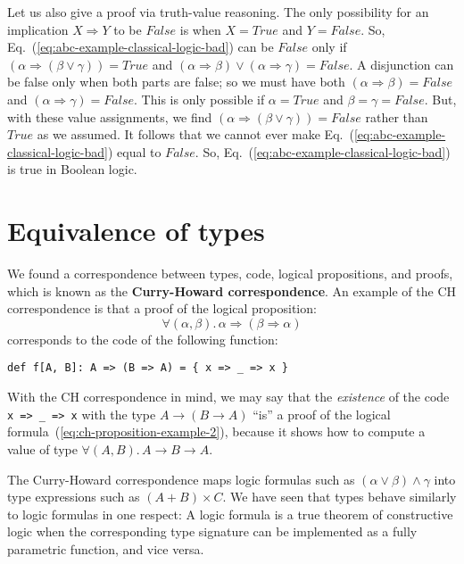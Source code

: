 Let us also give a proof via truth-value reasoning. The only possibility
for an implication $X\Rightarrow Y$ to be $False$ is when $X=True$
and $Y=False$. So, Eq.~(\ref{eq:abc-example-classical-logic-bad})
can be $False$ only if $\left(\alpha\Rightarrow(\beta\vee\gamma)\right)=True$
and $\left(\alpha\Rightarrow\beta\right)\vee\left(\alpha\Rightarrow\gamma\right)=False$.
A disjunction can be false only when both parts are false; so we must
have both $\left(\alpha\Rightarrow\beta\right)=False$ and $\left(\alpha\Rightarrow\gamma\right)=False$.
This is only possible if $\alpha=True$ and $\beta=\gamma=False$.
But, with these value assignments, we find $\left(\alpha\Rightarrow(\beta\vee\gamma)\right)=False$
rather than $True$ as we assumed. It follows that we cannot ever
make Eq.~(\ref{eq:abc-example-classical-logic-bad}) equal to $False$.
So, Eq.~(\ref{eq:abc-example-classical-logic-bad}) is true in Boolean
logic.

\section{Equivalence of types}

We found a correspondence between types, code, logical propositions,
and proofs, which is known as the \textbf{Curry-Howard correspondence}.
An example of the CH correspondence is that a proof of the logical
proposition:
\begin{equation}
\forall(\alpha,\beta).\,\alpha\Rightarrow\left(\beta\Rightarrow\alpha\right)\label{eq:ch-proposition-example-2}
\end{equation}
corresponds to the code of the following function:
\begin{lstlisting}
def f[A, B]: A => (B => A) = { x => _ => x }
\end{lstlisting}
With the CH correspondence in mind, we may say that the \emph{existence}
of the code \lstinline!x => _ => x! with the type $A\rightarrow(B\rightarrow A)$
\textsf{``}is\textsf{''} a proof of the logical formula~(\ref{eq:ch-proposition-example-2}),
because it shows how to compute a value of type $\forall(A,B).\,A\rightarrow B\rightarrow A$.

The Curry-Howard correspondence maps logic formulas such as $(\alpha\vee\beta)\wedge\gamma$
into type expressions such as $\left(A+B\right)\times C$. We have
seen that types behave similarly to logic formulas in one respect:
A logic formula is a true theorem of constructive logic when the corresponding
type signature can be implemented as a fully parametric function,
and vice versa.

